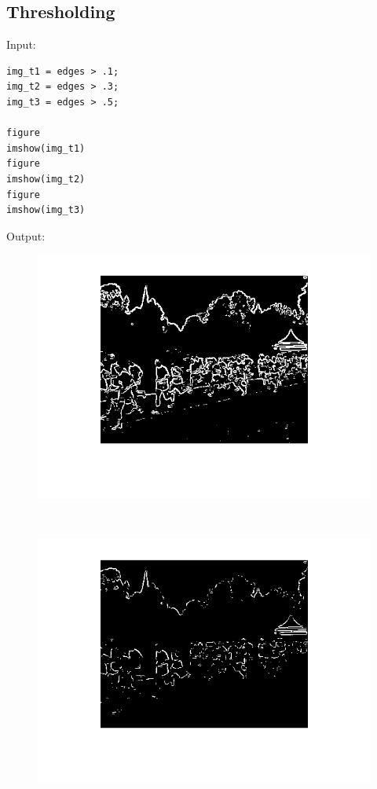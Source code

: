 \documentclass[12pt, a4paper]{article}
\begin{document}
\subsection{Thresholding}
Input:
\begin{verbatim}
img_t1 = edges > .1;
img_t2 = edges > .3;
img_t3 = edges > .5;

figure
imshow(img_t1)
figure
imshow(img_t2)
figure
imshow(img_t3)
\end{verbatim}
Output:
\begin{figure}[H]
	\centering
	\includegraphics[width=\textwidth]{fig6.png}
\end{figure}
~\\[-20mm]\begin{figure}[H]
	\centering
	\includegraphics[width=\textwidth]{fig7.png}
\end{figure}
\end{document}
